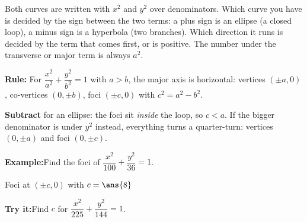 \documentclass[12pt]{article}
\begin{document}

\noindent\small Both curves are written with $x^2$ and $y^2$ over
denominators. Which curve you have is decided by the sign between the two
terms: a plus sign is an ellipse (a closed loop), a minus sign is a hyperbola
(two branches). Which direction it runs is decided by the term that comes
first, or is positive. The number under the transverse or major term is always
$a^2$.\normalsize

\begin{formulabox}
\textbf{Rule:} For $\dfrac{x^2}{a^2} + \dfrac{y^2}{b^2} = 1$ with $a > b$, the
major axis is horizontal: vertices $(\pm a, 0)$, co-vertices $(0, \pm b)$,
foci $(\pm c, 0)$ with $c^2 = a^2 - b^2$.\par
\textbf{Subtract} for an ellipse: the foci sit \emph{inside} the loop, so
$c < a$. If the bigger denominator is under $y^2$ instead, everything turns a
quarter-turn: vertices $(0, \pm a)$ and foci $(0, \pm c)$.
\end{formulabox}
\begin{examplebox}
\textbf{Example:}\quad Find the foci of $\dfrac{x^2}{100} + \dfrac{y^2}{36} = 1$.

Foci at $(\pm c, 0)$ with $c = \ans{8}$
\end{examplebox}
\begin{tryitbox}
\textbf{Try it:}\quad Find $c$ for $\dfrac{x^2}{225} + \dfrac{y^2}{144} = 1$.\\[2pt]
\end{tryitbox}
\end{document}
